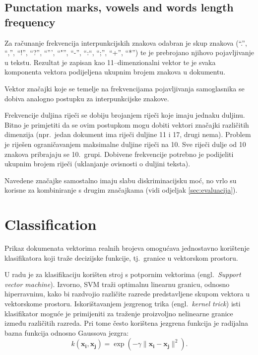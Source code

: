 \documentclass[11pt,english]{article}
\newcommand{\engl}[1]{(engl.~\emph{#1})}
\begin{document}
\begin{multicols}{2}
\subsection{Punctation marks, vowels and words length frequency}
\label{sec:znacajke-manje}
Za računanje frekvencija interpunkcijskih znakova odabran je skup znakova (``.'',
``,'', ``!'', ``?'', ``''', ``"'', ``-'', ``:``, ``;'', ``+'', ``*'') te je
prebrojano njihovo pojavljivanje u tekstu. Rezultat je zapisan kao
11--dimenzionalni vektor te je svaka komponenta vektora podijeljena ukupnim
brojem znakova u dokumentu.

Vektor značajki koje se temelje na frekvencijama pojavljivanja samoglasnika se
dobiva analogno postupku za interpunkcijske znakove.

Frekvencije duljina riječi se dobiju brojanjem riječi koje imaju jednaku duljinu.
Bitno je primjetiti da se ovim postupkom mogu dobiti vektori značajki različitih
dimenzija (npr.\ jedan dokument ima riječi duljine 11 i 17, drugi nema). Problem
je riješen ograničavanjem maksimalne duljine riječi na 10. Sve riječi dulje od 10
znakova pribrajaju se 10.\ grupi. Dobivene frekvencije potrebno je podijeliti
ukupnim brojem riječi (uklanjanje ovisnosti o duljini teksta).

Navedene značajke samostalno imaju slabu diskriminacijsku moć, no vrlo su korisne
za kombiniranje s drugim značajkama (vidi odjeljak \ref{sec:evaluacija}).

\section{Classification}
Prikaz dokumenata vektorima realnih brojeva omogućava jednostavno korištenje
klasifikatora koji traže decizijske funkcije, tj.\ granice u vektorskom
prostoru.


U radu je za klasifikaciju korišten stroj s potpornim vektorima \engl{Support
vector machine}. Izvorno, SVM traži optimalnu linearnu granicu, odnosno
hiperravninu, kako bi razdvojio različite razrede predstavljene skupom vektora u
vektorskome prostoru. Iskorištavanjem jezgrenog trika \engl{kernel trick} isti
klasifikator moguće je primijeniti za traženje proizvoljno nelinearne granice
između različitih razreda. Pri tome često korištena jezgrena funkcija je
radijalna bazna funkcija odnosno Gaussova jezgra:
\begin{equation}
k(\mathbf{x_i},\mathbf{x_j})=\exp(-\gamma \|\mathbf{x_i} - \mathbf{x_j}\|^2).
\end{equation}


\end{multicols}
\end{document}
